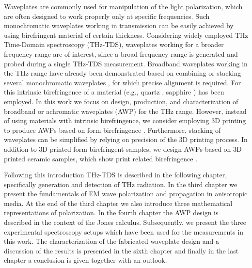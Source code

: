 Waveplates are commonly used for manipulation of the light polarization, which are often designed to work properly only at specific frequencies. Such monochromatic waveplates working in transmission can be easily achieved by using birefringent material of certain thickness. Considering widely employed THz Time-Domain spectroscopy (THz-TDS), waveplates working for a broader frequency range are of interest, since a broad frequency range is generated and probed during a single THz-TDS measurement. Broadband waveplates working in the THz range have already been demonstrated based on combining or stacking several monochromatic waveplates \cite{Wu2020, Masson2006, Ivanov2012, Herrera-Fernandez2015}, for which precise alignment is required. For this intrinsic birefringence of a material (e.g., quartz \cite{Masson2006}, sapphire \cite{Wu2020}) has been employed. In this work we focus on design, production, and characterization of broadband or achromatic waveplates (AWP) for the THz range. However, instead of using materials with intrinsic birefringence, we consider employing 3D printing to produce AWPs based on form birefringence \cite{Scheller2010}. Furthermore, stacking of waveplates can be simplified by relying on precision of the 3D printing process. In addition to 3D printed form birefringent samples, we design AWPs based on 3D printed ceramic samples, which show print related birefringence \cite{Ornik2021}. 

Following this introduction THz-TDS is described in the following chapter, specifically generation and detection of THz radiation. In the third chapter we present the fundamentals of EM wave polarization and propagation in anisotropic media. At the end of the third chapter we also introduce three mathematical representations of polarization. In the fourth chapter the AWP design is described in the context of the Jones calculus. Subsequently, we present the three experimental spectroscopy setups which have been used for the measurements in this work. The characterization of the fabricated waveplate design and a discussion of the results is presented in the sixth chapter and finally in the last chapter a conclusion is given together with an outlook.


